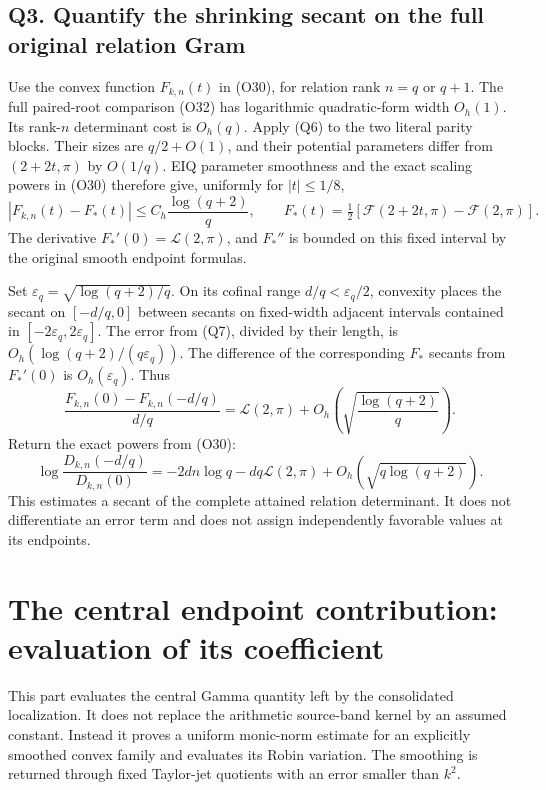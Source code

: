 \documentclass[11pt,a4paper]{article}
\begin{document}
\subsection{Q3. Quantify the shrinking secant on the full original
relation
Gram}\label{sa:q3.-quantify-the-shrinking-secant-on-the-full-original-relation-gram}

Use the convex function \(F_{k,n}(t)\) in (O30), for relation rank
\(n=q\) or \(q+1\). The full paired-root comparison (O32) has
logarithmic quadratic-form width \(O_h(1)\). Its rank-\(n\) determinant
cost is \(O_h(q)\). Apply (Q6) to the two literal parity blocks. Their
sizes are \(q/2+O(1)\), and their potential parameters differ from
\((2+2t,\pi)\) by \(O(1/q)\). EIQ parameter smoothness and the exact
scaling powers in (O30) therefore give, uniformly for \(|t|\le1/8\), \[
\boxed{\left|F_{k,n}(t)-F_*(t)\right|\le C_h\frac{\log(q+2)}q,
\qquad
F_*(t)=\tfrac12[\mathcal F(2+2t,\pi)-\mathcal F(2,\pi)].}
\tag{Q7}
\] The derivative \(F_*'(0)=\mathcal L(2,\pi)\), and \(F_*''\) is
bounded on this fixed interval by the original smooth endpoint formulas.

Set \(\varepsilon_q=\sqrt{\log(q+2)/q}\). On its cofinal range
\(d/q<\varepsilon_q/2\), convexity places the secant on \([-d/q,0]\)
between secants on fixed-width adjacent intervals contained in
\([-2\varepsilon_q,2\varepsilon_q]\). The error from (Q7), divided by
their length, is \(O_h(\log(q+2)/(q\varepsilon_q))\). The difference of
the corresponding \(F_*\) secants from \(F_*'(0)\) is
\(O_h(\varepsilon_q)\). Thus \[
\frac{F_{k,n}(0)-F_{k,n}(-d/q)}{d/q}
=\mathcal L(2,\pi)+O_h\!\left(\sqrt{\frac{\log(q+2)}q}\right).
\] Return the exact powers from (O30): \[
\boxed{\log\frac{D_{k,n}(-d/q)}{D_{k,n}(0)}
=-2dn\log q-dq\mathcal L(2,\pi)
+O_h(\sqrt{q\log(q+2)}).}
\tag{Q8}
\] This estimates a secant of the complete attained relation
determinant. It does not differentiate an error term and does not assign
independently favorable values at its endpoints.

\newpage

\section{The central endpoint contribution: evaluation of its
coefficient}\label{sa:the-central-endpoint-contribution-evaluation-of-its-coefficient}

This part evaluates the central Gamma quantity left by the consolidated
localization. It does not replace the arithmetic source-band kernel by
an assumed constant. Instead it proves a uniform monic-norm estimate for
an explicitly smoothed convex family and evaluates its Robin variation.
The smoothing is returned through fixed Taylor-jet quotients with an
error smaller than \(k^2\).
\end{document}
